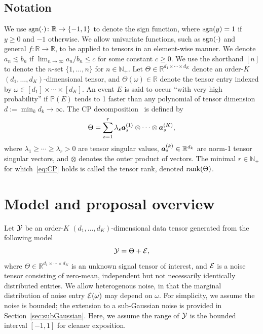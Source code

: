 \documentclass[11pt]{article}
\theoremstyle{plain}
\theoremstyle{definition}
\def\sign{\textup{sgn}}
\def\rank{\textup{rank}}
\begin{document}
\subsection{Notation}
We use $\sign(\cdot)\colon \mathbb{R}\to\{-1,1\}$ to denote the sign function, where $\sign(y)=1$ if $y\geq 0$ and $-1$ otherwise. We allow univariate functions, such as $\sign(\cdot)$ and general $f\colon \mathbb{R}\to\mathbb{R}$, to be applied to tensors in an element-wise manner. 
We denote $a_n\lesssim b_n$ if $\lim_{n\to \infty} a_n/b_n\leq c$ for some constant $c\geq0$.  We use the shorthand $[n]$ to denote the $n$-set $\{1,\ldots,n\}$ for $n\in\mathbb{N}_{+}$. Let $\Theta\in\mathbb{R}^{d_1\times \cdots \times d_K}$ denote an order-$K$ $(d_1,\ldots,d_K)$-dimensional tensor, and $\Theta(\omega)\in\mathbb{R}$ denote the tensor entry indexed by $\omega \in[d_1]\times \cdots \times [d_K]$. An event $E$ is said to occur ``with very high probability'' if $\mathbb{P}(E)$ tends to 1 faster than any polynomial of tensor dimension $d:=\min_k d_k \to\infty$. The CP decomposition~\citep{hitchcock1927expression} is defined by
\begin{equation}\label{eq:CP}
\Theta=\sum_{s=1}^r\lambda_s \bm{a}^{(1)}_s\otimes\cdots\otimes \bm{a}^{(K)}_s,
\end{equation}
where $\lambda_1\geq \cdots \geq \lambda_r>0$ are tensor singular values, $\bm{a}^{(k)}_s\in\mathbb{R}^{d_k}$ are norm-1 tensor singular vectors, and $\otimes$ denotes the outer product of vectors. The minimal $r\in\mathbb{N}_{+}$ for which~\eqref{eq:CP} holds is called the tensor rank, denoted $\rank(\Theta)$.  


\section{Model and proposal overview}\label{sec:overview}
Let $\mathcal{Y}$ be an order-$K$ $(d_1,\ldots,d_K)$-dimensional data tensor generated from the following model
\begin{equation}\label{eq:model}
\mathcal{Y}=\Theta+\mathcal{E},
\end{equation}
where $\Theta\in\mathbb{R}^{d_1\times \cdots \times d_K}$ is an unknown signal tensor of interest, and $\mathcal{E}$ is a noise tensor consisting of zero-mean, independent but not necessarily identically distributed entries. We allow heterogenous noise, in that the marginal distribution of noise entry $\mathcal{E}(\omega)$ may depend on $\omega$.
For simplicity, we assume the noise is bounded; the extension to a sub-Gaussian noise is provided in Section~\ref{sec:subGaussian}.  Here,  we assume the range of $\mathcal{Y}$ is the bounded interval $[-1,1]$ for cleaner exposition.
\end{document}
